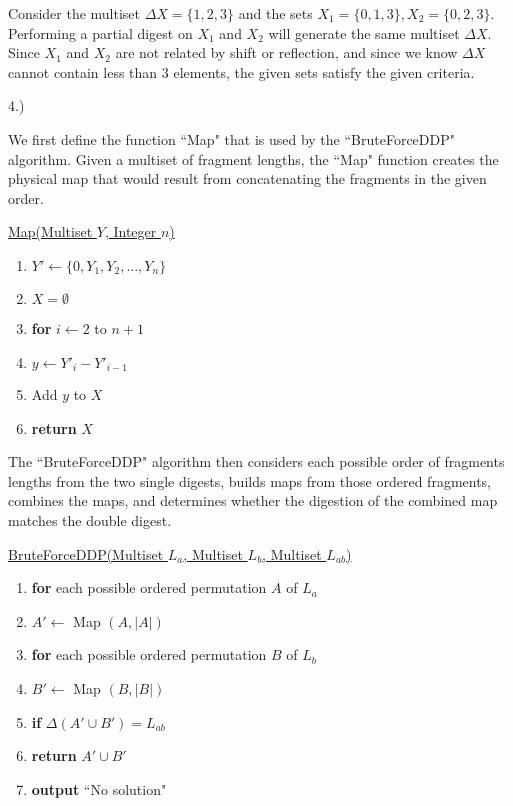 \documentclass[a4paper, 10pt]{article}
\newcommand{\unit}{4.}
\newcounter{prob_num}
\newcommand{\problem}{\vspace{20pt}\unit\arabic{prob_num})\stepcounter{prob_num}\par}
\newenvironment{menumerate}
{
  \begin{enumerate}
  \setlength{\itemsep}{1pt}
  \setlength{\parskip}{0pt}
  \setlength{\parsep}{0pt}}{\end{enumerate}
}
\newcommand{\blk}{\hspace{24pt}}
\begin{document}
\noindent Consider the multiset $\Delta X = \{ 1,2,3 \}$ and the sets $X_1 = \{ 0,1,3 \}, X_2 = \{ 0,2,3 \}$. Performing a partial digest on $X_1$ and $X_2$ will generate the same multiset $\Delta X$. Since $X_1$ and $X_2$ are not related by shift or reflection, and since we know $\Delta X$ cannot contain less than 3 elements, the given sets satisfy the given criteria.

\problem

We first define the function ``Map" that is used by the ``BruteForceDDP" algorithm. Given a multiset of fragment lengths, the ``Map" function creates the physical map that would result from concatenating the fragments in the given order.

\vspace{30pt}

\noindent \underline{Map(Multiset $Y$, Integer $n$)}
\begin{menumerate}
\item $Y' \leftarrow \{ 0, Y_1, Y_2, ... , Y_n \} $
\item $X = \emptyset$
\item \textbf{for} $i \leftarrow 2 $ to $n+1$
\item \blk $y \leftarrow Y'_i - Y'_{i-1}$
\item \blk Add $y$ to $X$
\item \textbf{return} $X$
\end{menumerate}

\vspace{12pt}

The ``BruteForceDDP" algorithm then considers each possible order of fragments lengths from the two single digests, builds maps from those ordered fragments, combines the maps, and determines whether the digestion of the combined map matches the double digest.

\noindent \underline{BruteForceDDP(Multiset $L_a$, Multiset $L_b$, Multiset $L_{ab}$)}
\begin{menumerate}
\item \textbf{for} each possible ordered permutation $A$ of $L_a$
\item \blk $A' \leftarrow$ Map $(A, |A|)$
\item \blk \textbf{for} each possible ordered permutation $B$ of $L_b$
\item \blk \blk $B' \leftarrow$ Map $(B, |B|)$
\item \blk \blk \textbf{if} $\Delta(A' \cup B') = L_{ab}$
\item \blk \blk \blk \textbf{return} $A' \cup B'$
\item \textbf{output} ``No solution"
\end{menumerate}
\end{document}
